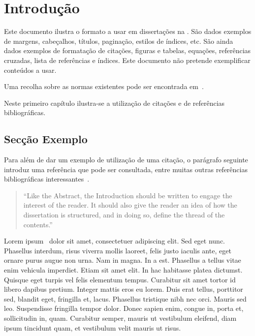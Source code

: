 \chapter{Introdução} \label{chap:intro}

Este documento ilustra o formato a usar em dissertações na \Feup.
São dados exemplos de margens, cabeçalhos, títulos, paginação, estilos
de índices, etc. 
São ainda dados exemplos de formatação de citações, figuras e tabelas,
equações, referências cruzadas, lista de referências e índices.
Este documento não pretende exemplificar conteúdos a usar.

Uma recolha sobre as normas existentes pode ser encontrada em~\citet{kn:Mat93}.

Neste primeiro capítulo ilustra-se a utilização de citações e de
referências bibliográficas.

\section{Secção Exemplo} \label{sec:context}

Para além de dar um exemplo de utilização de uma citação, o parágrafo
seguinte introduz uma referência que pode ser consultada, entre muitas
outras referências bibliográficas interessantes~\citep{kn:Tha01,kn:PP05}.

\begin{quote}
  ``Like the Abstract, the Introduction should be written to engage the
  interest of the reader. It should also give the reader an idea of
  how the dissertation is structured, and in doing so, define the
  thread of the contents.''~\citep[chap.\ Introduction]{kn:Tha01} 
\end{quote}

Lorem ipsum~\citep{kn:Lip08} dolor sit amet, consectetuer adipiscing
elit. 
Sed eget nunc. Phasellus interdum, risus viverra mollis laoreet, felis
justo iaculis ante, eget ornare purus augue non urna. Nam in magna. In a
est. Phasellus a tellus vitae enim vehicula imperdiet. Etiam sit amet
elit. In hac habitasse platea dictumst. Quisque eget turpis vel felis
elementum tempus. Curabitur sit amet tortor id libero dapibus
pretium. Integer mattis eros eu lorem. Duis erat tellus, porttitor
sed, blandit eget, fringilla et, lacus. Phasellus tristique nibh nec
orci. Mauris sed leo. Suspendisse fringilla tempor dolor. Donec sapien
enim, congue in, porta et, sollicitudin in, quam. Curabitur semper,
mauris ut vestibulum eleifend, diam ipsum tincidunt quam, et
vestibulum velit mauris ut risus. 

